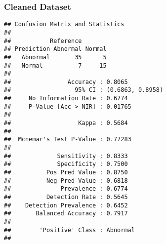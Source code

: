 \documentclass[
]{article}
\newenvironment{Shaded}{\begin{snugshade}}{\end{snugshade}}
\newcommand{\DataTypeTok}[1]{\textcolor[rgb]{0.13,0.29,0.53}{#1}}
\newcommand{\DecValTok}[1]{\textcolor[rgb]{0.00,0.00,0.81}{#1}}
\newcommand{\KeywordTok}[1]{\textcolor[rgb]{0.13,0.29,0.53}{\textbf{#1}}}
\newcommand{\NormalTok}[1]{#1}
\newcommand{\OperatorTok}[1]{\textcolor[rgb]{0.81,0.36,0.00}{\textbf{#1}}}
\newcommand{\OtherTok}[1]{\textcolor[rgb]{0.56,0.35,0.01}{#1}}
\newcommand{\StringTok}[1]{\textcolor[rgb]{0.31,0.60,0.02}{#1}}
\begin{document}
\hypertarget{cleaned-dataset-6}{%
\subsubsection{Cleaned Dataset}\label{cleaned-dataset-6}}

\begin{Shaded}
\end{Shaded}

\begin{verbatim}
## Confusion Matrix and Statistics
## 
##           Reference
## Prediction Abnormal Normal
##   Abnormal       35      5
##   Normal          7     15
##                                           
##                Accuracy : 0.8065          
##                  95% CI : (0.6863, 0.8958)
##     No Information Rate : 0.6774          
##     P-Value [Acc > NIR] : 0.01765         
##                                           
##                   Kappa : 0.5684          
##                                           
##  Mcnemar's Test P-Value : 0.77283         
##                                           
##             Sensitivity : 0.8333          
##             Specificity : 0.7500          
##          Pos Pred Value : 0.8750          
##          Neg Pred Value : 0.6818          
##              Prevalence : 0.6774          
##          Detection Rate : 0.5645          
##    Detection Prevalence : 0.6452          
##       Balanced Accuracy : 0.7917          
##                                           
##        'Positive' Class : Abnormal        
## 
\end{verbatim}
\end{document}
